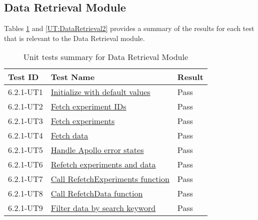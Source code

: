 \documentclass[12pt, titlepage]{article}
\begin{document}
\subsection{Data Retrieval Module}
Tables \ref{UT:DataRetrieval1} and \ref{UT:DataRetrieval2} provides a summary of
the results for each test that is relevant to the Data Retrieval module.
\begin{table}[H]
  \centering
  \begin{tabular}{|l|l|l|}
    \hline
    \textbf{Test ID} & \textbf{Test Name} & \textbf{Result}\\
    \hline
    6.2.1-UT1 &
    \href{https://github.com/SumanyaG/Alkalytics/blob/main/src/frontend/test/hooks/useTable.test.tsx}{Initialize
    with default values} & Pass \\
    \hline
    6.2.1-UT2 &
    \href{https://github.com/SumanyaG/Alkalytics/blob/main/src/frontend/test/hooks/useTable.test.tsx}{Fetch
    experiment IDs} & Pass \\
    \hline
    6.2.1-UT3 &
    \href{https://github.com/SumanyaG/Alkalytics/blob/main/src/frontend/test/hooks/useTable.test.tsx}{Fetch
    experiments} & Pass \\
    \hline
    6.2.1-UT4 &
    \href{https://github.com/SumanyaG/Alkalytics/blob/main/src/frontend/test/hooks/useTable.test.tsx}{Fetch
    data} & Pass \\
    \hline
    6.2.1-UT5 &
    \href{https://github.com/SumanyaG/Alkalytics/blob/main/src/frontend/test/hooks/useTable.test.tsx}{Handle
    Apollo error states} & Pass \\
    \hline
    6.2.1-UT6 &
    \href{https://github.com/SumanyaG/Alkalytics/blob/main/src/frontend/test/hooks/useTable.test.tsx}{Refetch
    experiments and data} & Pass \\
    \hline
    6.2.1-UT7 &
    \href{https://github.com/SumanyaG/Alkalytics/blob/main/src/frontend/test/hooks/useTable.test.tsx}{Call
    RefetchExperiments function} & Pass \\
    \hline
    6.2.1-UT8 &
    \href{https://github.com/SumanyaG/Alkalytics/blob/main/src/frontend/test/hooks/useTable.test.tsx}{Call
    RefetchData function} & Pass \\
    \hline
    6.2.1-UT9 &
    \href{https://github.com/SumanyaG/Alkalytics/blob/main/src/frontend/test/hooks/TableHeader.test.tsx}{Filter
    data by search keyword} & Pass \\
    \hline
  \end{tabular}
  \caption{Unit tests summary for Data Retrieval Module}
  \label{UT:DataRetrieval1}
\end{table}
\end{document}

